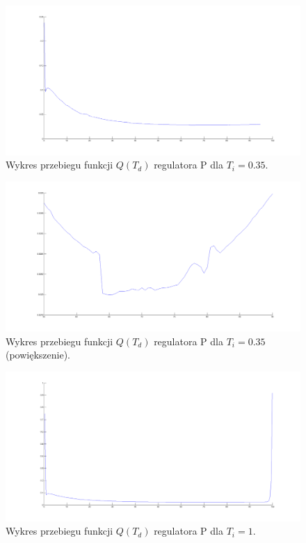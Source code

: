 \documentclass[a4paper,10pt]{article}
\begin{document}
\begin{figure}[!h]
    \centering
	\includegraphics[width=130mm]{CW2-regulatorPID-ti35-opt1.png}
	\caption{Wykres przebiegu funkcji $Q(T_{d})$ regulatora P dla $T_{i}=0.35$.}
    \label{fig:regulatorPIDti35opt1}
\end{figure}
\begin{figure}[!h]
    \centering
	\includegraphics[width=130mm]{CW2-regulatorPID-ti35-opt2.png}
	\caption{Wykres przebiegu funkcji $Q(T_{d})$ regulatora P dla $T_{i}=0.35$ (powiększenie).}
    \label{fig:regulatorPIDti35opt2}
\end{figure}
\begin{figure}[!h]
    \centering
	\includegraphics[width=130mm]{CW2-regulatorPID-ti100-opt1.png}
	\caption{Wykres przebiegu funkcji $Q(T_{d})$ regulatora P dla $T_{i}=1$.}
    \label{fig:regulatorPIDti100opt1}
\end{figure}
\end{document}
